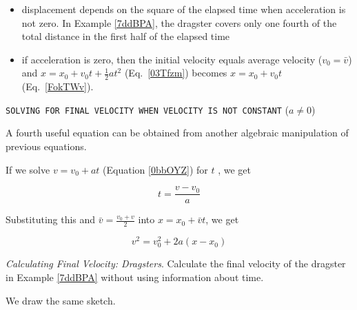 \documentclass[main-ap-physics.tex]{subfiles}
\begin{document}
\begin{itemize}
    \item displacement depends on the square of the elapsed time when acceleration is not zero. In Example \ref{7ddBPA}, the dragster covers only one fourth of the total distance in the first half of the elapsed time
    \item if acceleration is zero, then the initial velocity equals average velocity ($v_0 = \bar{v}$) and $x = x_0 + v_0 t + \frac{1}{2} a t^2$ (Eq.~\ref{03Tfzm}) becomes $x = x_0 + v_0 t$ (Eq.~\ref{FokTWv}).
\end{itemize}

\cyanhrule

\vspace{1em}

\texttt{SOLVING FOR FINAL VELOCITY WHEN VELOCITY IS NOT CONSTANT} ($a \neq 0 $)

\vspace{1em}

A fourth useful equation can be obtained from another algebraic manipulation of previous equations.

\vspace{1em}

If we solve $v = v_0 + a t$ (Equation \ref{0bbOYZ}) for $t$ , we get

\begin{equation*}
    t = \frac{v - v_0}{a} 
\end{equation*}

Substituting this and $\bar{v} = \frac{v_0 + v}{2}$ into $x = x_0 + \bar{v} t$, we get 

\begin{equation} \label{jIcda3}
    v^2 = v_0^2 + 2 a (x-x_0)
\end{equation}

\cyanhrule

\vspace{1em}

\begin{example}
    \textit{Calculating Final Velocity: Dragsters}. Calculate the final velocity of the dragster in Example \ref{7ddBPA} without using information about time.
\end{example}

\Solution We draw the same sketch.

\begin{center}
\end{center}
\end{document}
